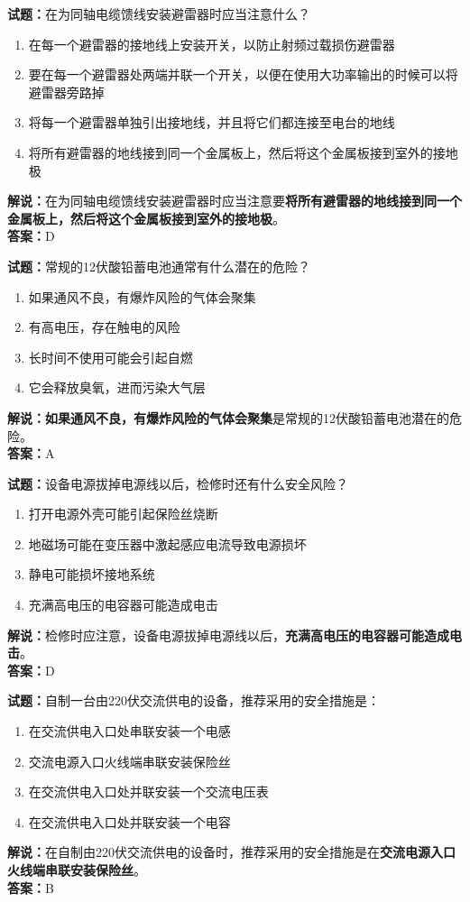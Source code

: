 \documentclass{ctexbook}
\begin{document}
\bigskip


\noindent\textbf{试题：}在为同轴电缆馈线安装避雷器时应当注意什么？
\begin{enumerate}[leftmargin=3em]
	\item 在每一个避雷器的接地线上安装开关，以防止射频过载损伤避雷器
	\item 要在每一个避雷器处两端并联一个开关，以便在使用大功率输出的时候可以将避雷器旁路掉
	\item 将每一个避雷器单独引出接地线，并且将它们都连接至电台的地线
	\item 将所有避雷器的地线接到同一个金属板上，然后将这个金属板接到室外的接地极
\end{enumerate}
\noindent\textbf{解说：}在为同轴电缆馈线安装避雷器时应当注意要\textbf{将所有避雷器的地线接到同一个金属板上，然后将这个金属板接到室外的接地极}。\\\noindent\textbf{答案：}D

\bigskip


\noindent\textbf{试题：}常规的12伏酸铅蓄电池通常有什么潜在的危险？
\begin{enumerate}[leftmargin=3em]
	\item 如果通风不良，有爆炸风险的气体会聚集
	\item 有高电压，存在触电的风险
	\item 长时间不使用可能会引起自燃
	\item 它会释放臭氧，进而污染大气层
\end{enumerate}
\noindent\textbf{解说：}\textbf{如果通风不良，有爆炸风险的气体会聚集}是常规的12伏酸铅蓄电池潜在的危险。\\\noindent\textbf{答案：}A

\bigskip


\noindent\textbf{试题：}设备电源拔掉电源线以后，检修时还有什么安全风险？
\begin{enumerate}[leftmargin=3em]
	\item 打开电源外壳可能引起保险丝烧断
	\item 地磁场可能在变压器中激起感应电流导致电源损坏
	\item 静电可能损坏接地系统
	\item 充满高电压的电容器可能造成电击
\end{enumerate}
\noindent\textbf{解说：}检修时应注意，设备电源拔掉电源线以后，\textbf{充满高电压的电容器可能造成电击}。\\\noindent\textbf{答案：}D

\bigskip


\noindent\textbf{试题：}自制一台由220伏交流供电的设备，推荐采用的安全措施是：
\begin{enumerate}[leftmargin=3em]
	\item 在交流供电入口处串联安装一个电感
	\item 交流电源入口火线端串联安装保险丝
	\item 在交流供电入口处并联安装一个交流电压表
	\item 在交流供电入口处并联安装一个电容
\end{enumerate}
\noindent\textbf{解说：}在自制由220伏交流供电的设备时，推荐采用的安全措施是在\textbf{交流电源入口火线端串联安装保险丝}。\\\noindent\textbf{答案：}B
\end{document}
